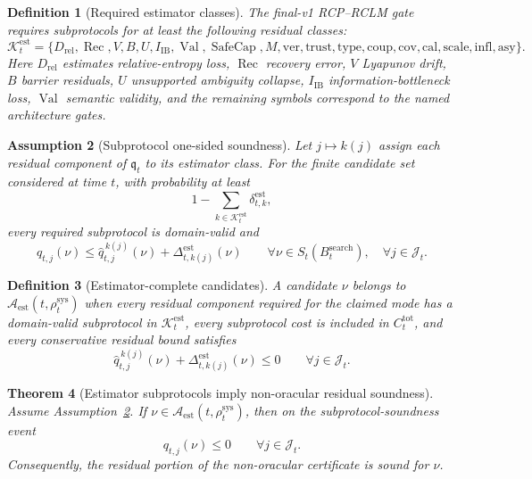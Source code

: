 \documentclass[11pt,a4paper]{article}
\newtheorem{theorem}{Theorem}[section]
\newtheorem{definition}[theorem]{Definition}
\newtheorem{assumption}[theorem]{Assumption}
\newcommand{\Acal}{\mathcal A}
\newcommand{\calib}{\mathrm{cal}}
\newcommand{\sys}{\mathrm{sys}}
\newcommand{\IB}{\mathrm{IB}}
\newcommand{\rel}{\mathrm{rel}}
\newcommand{\SafeCap}{\operatorname{SafeCap}}
\newcommand{\Val}{\operatorname{Val}}
\newcommand{\ver}{\mathrm{ver}}
\newcommand{\asy}{\mathrm{asy}}
\newcommand{\search}{\mathrm{search}}
\newcommand{\coup}{\mathrm{coup}}
\newcommand{\trust}{\mathrm{trust}}
\newcommand{\scale}{\mathrm{scale}}
\newcommand{\infl}{\mathrm{infl}}
\newcommand{\tot}{\mathrm{tot}}
\newcommand{\Rec}{\operatorname{Rec}}
\newcommand{\cov}{\mathrm{cov}}
\newcommand{\est}{\mathrm{est}}
\begin{document}
\begin{definition}[Required estimator classes]
\label{def:required-estimator-classes}
The final-v1 RCP--RCLM gate requires subprotocols for at least the following residual classes:
\[
\mathcal K_t^{\est}=\{
D_{\rel},\Rec,V,B,U,I_{\IB},\Val,\SafeCap,M,\ver,\trust,\mathrm{type},\coup,\cov,\calib,\scale,\infl,\asy
\}.
\]
Here \(D_{\rel}\) estimates relative-entropy loss, \(\Rec\) recovery error, \(V\) Lyapunov drift, \(B\) barrier residuals, \(U\) unsupported ambiguity collapse, \(I_{\IB}\) information-bottleneck loss, \(\Val\) semantic validity, and the remaining symbols correspond to the named architecture gates.
\end{definition}

\begin{assumption}[Subprotocol one-sided soundness]
\label{ass:subprotocol-one-sided-soundness}
Let \(j\mapsto k(j)\) assign each residual component of \(\mathfrak q_t\) to its estimator class. For the finite candidate set considered at time \(t\), with probability at least
\[
1-\sum_{k\in\mathcal K_t^{\est}}\delta_{t,k}^{\est},
\]
every required subprotocol is domain-valid and
\[
q_{t,j}(\nu)
\le
\widehat q_{t,j}^{\,k(j)}(\nu)+\Delta_{t,k(j)}^{\est}(\nu)
\qquad
\forall \nu\in S_t(B_t^{\search}),\quad \forall j\in\mathcal J_t.
\]
\end{assumption}

\begin{definition}[Estimator-complete candidates]
\label{def:estimator-complete-candidates}
A candidate \(\nu\) belongs to \(\Acal_{\est}(t,\rho_t^{\sys})\) when every residual component required for the claimed mode has a domain-valid subprotocol in \(\mathcal K_t^{\est}\), every subprotocol cost is included in \(C_t^{\tot}\), and every conservative residual bound satisfies
\[
\widehat q_{t,j}^{\,k(j)}(\nu)+\Delta_{t,k(j)}^{\est}(\nu)
\le0
\qquad
\forall j\in\mathcal J_t.
\]
\end{definition}

\begin{theorem}[Estimator subprotocols imply non-oracular residual soundness]
\label{thm:estimator-subprotocols-imply-soundness}
Assume Assumption~\ref{ass:subprotocol-one-sided-soundness}. If \(\nu\in\Acal_{\est}(t,\rho_t^{\sys})\), then on the subprotocol-soundness event
\[
q_{t,j}(\nu)\le0
\qquad
\forall j\in\mathcal J_t.
\]
Consequently, the residual portion of the non-oracular certificate is sound for \(\nu\).
\end{theorem}
\end{document}
